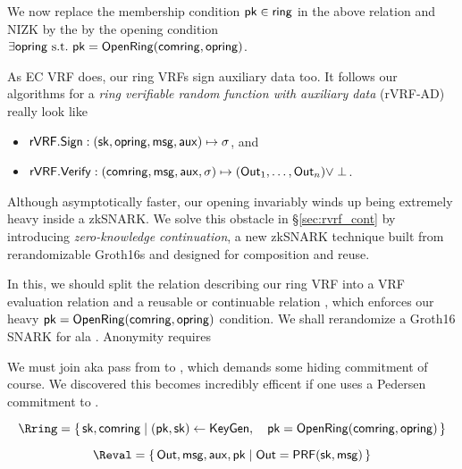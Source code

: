 We now replace the membership condition $\mathsf{pk} \in \mathsf{ring}$ in the above
relation and NIZK by the by the opening condition
$\exists \mathsf{opring} \textrm{\ s.t.\ } \mathsf{pk} = {\mathsf{OpenRing}}(\mathsf{comring},\mathsf{opring})$.
%

As EC VRF does, our ring VRFs sign auxiliary data \aux too.
It follows our algorithms for a {\em ring verifiable random function
with auxiliary data} (rVRF-AD) really look like
\begin{itemize}
\item ${\mathsf{rVRF}}.{\mathsf{Sign}} : (\mathsf{sk},\mathsf{opring},\mathsf{msg},\mathsf{aux}) \mapsto \sigma$, and
\item ${\mathsf{rVRF}}.{\mathsf{Verify}} : (\mathsf{comring},\mathsf{msg},\mathsf{aux},\sigma) \mapsto ({\mathsf{Out}}_1,\ldots,{\mathsf{Out}}_n) \lor \perp$.
\end{itemize}

Although asymptotically faster, our opening \OpenRing invariably
winds up being extremely heavy inside a zkSNARK.
We solve this obstacle in \S\ref{sec:rvrf_cont} by introducing
{\em zero-knowledge continuation}, a new zkSNARK technique built from
rerandomizable Groth16s and designed for composition and reuse.

In this, we should split the relation describing our ring VRF into
a VRF evaluation relation \Reval and a reusable or continuable relation
\Rring, which enforces our heavy $\mathsf{pk} = {\mathsf{OpenRing}}(\mathsf{comring},\mathsf{opring})$
condition.  We shall rerandomize a Groth16 SNARK for \Rring ala
\cite[Theorem 3, Appendix C, pp. 31]{RandomizationGroth16}.
Anonymity requires

We must join aka pass \pk from \Rring to \Reval, which demands some
hiding commitment \compk of course.  We discovered this becomes
incredibly efficent if one uses a Pedersen commitment to \sk.

$$ \Rring = \Setst{ \sk, \comring }{
    (\pk,\sk) \leftarrow \KeyGen, \quad %
    \pk = \OpenRing(\comring,\openring) 
} $$

$$ \Reval = \Setst{ \Out, \msg, \aux, \pk }{ \Out = \PRF(\sk,\msg) } $$

